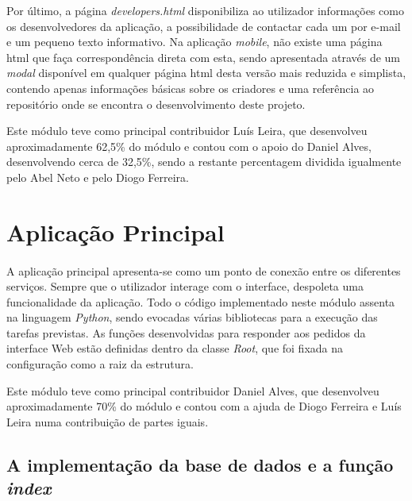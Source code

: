 \documentclass[11pt,openany,twoside]{report}
\begin{document}
Por último, a página \textit{developers.html} disponibiliza ao utilizador informações como os desenvolvedores da aplicação, a possibilidade de contactar cada um por e-mail e um pequeno texto informativo. Na aplicação \textit{mobile}, não existe uma página \acs{html} que faça correspondência direta com esta, sendo apresentada através de um \textit{modal} disponível em qualquer página \acs{html} desta versão mais reduzida e simplista, contendo apenas informações básicas sobre os criadores e uma referência ao repositório onde se encontra o desenvolvimento deste projeto.

Este módulo teve como principal contribuidor Luís Leira, que desenvolveu aproximadamente 62,5\% do módulo e contou com o apoio do Daniel Alves, desenvolvendo cerca de 32,5\%, sendo a restante percentagem dividida igualmente pelo Abel Neto e pelo Diogo Ferreira.

\section{Aplicação Principal}
\paragraph{ } A aplicação principal apresenta-se como um ponto de conexão entre os diferentes serviços. Sempre que o utilizador interage com o interface, despoleta uma funcionalidade da aplicação. Todo o código implementado neste módulo assenta na linguagem \textit{Python}, sendo evocadas várias bibliotecas para a execução das tarefas previstas. As funções desenvolvidas para responder aos pedidos da interface Web estão definidas dentro da classe \textit{Root}, que foi fixada na configuração como a raiz da estrutura.

Este módulo teve como principal contribuidor Daniel Alves, que desenvolveu aproximadamente 70\% do módulo e contou com a ajuda de Diogo Ferreira e Luís Leira numa contribuição de partes iguais.

\subsection{A implementação da base de dados e a função \textit{index}}
\end{document}

